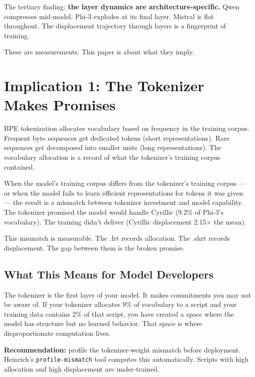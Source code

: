 \documentclass[11pt,a4paper]{article}
\begin{document}
The tertiary finding: \textbf{the layer dynamics are architecture-specific.} Qwen compresses mid-model. Phi-3 explodes at its final layer. Mistral is flat throughout. The displacement trajectory through layers is a fingerprint of training.

These are measurements. This paper is about what they imply.

\section{Implication 1: The Tokenizer Makes Promises}

BPE tokenization allocates vocabulary based on frequency in the training corpus. Frequent byte sequences get dedicated tokens (short representations). Rare sequences get decomposed into smaller units (long representations). The vocabulary allocation is a record of what the tokenizer's training corpus contained.

When the model's training corpus differs from the tokenizer's training corpus --- or when the model fails to learn efficient representations for tokens it was given --- the result is a mismatch between tokenizer investment and model capability. The tokenizer promised the model would handle Cyrillic (9.2\% of Phi-3's vocabulary). The training didn't deliver (Cyrillic displacement 2.15$\times$ the mean).

This mismatch is measurable. The .frt records allocation. The .shrt records displacement. The gap between them is the broken promise.

\subsection{What This Means for Model Developers}

The tokenizer is the first layer of your model. It makes commitments you may not be aware of. If your tokenizer allocates 9\% of vocabulary to a script and your training data contains 2\% of that script, you have created a space where the model has structure but no learned behavior. That space is where disproportionate computation lives.

\textbf{Recommendation:} profile the tokenizer-weight mismatch before deployment. Heinrich's \texttt{profile-mismatch} tool computes this automatically. Scripts with high allocation and high displacement are under-trained.
\end{document}
